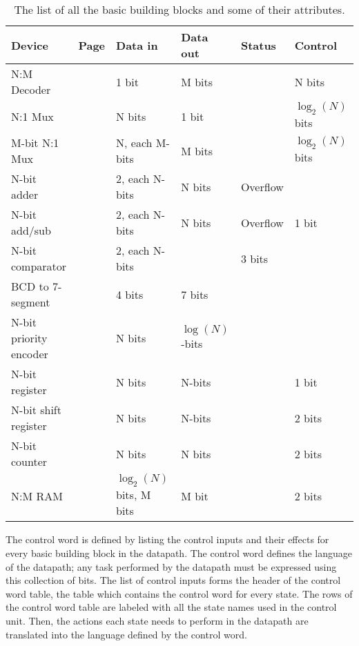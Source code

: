 \begin{table}
{\small
\begin{tabular}{|l|l|l|l|l|l|} \hline
Device      & Page & Data in     & Data out & Status   & Control \\ \hline
N:M Decoder & \pageref{page:dec}          & 1 bit       & M bits  & 	& N bits  \\ \hline
N:1 Mux     & \pageref{page:mux}          & N bits  & 1 bit    & 	&  $\log_2(N)$ bits  \\ \hline
M-bit N:1 Mux   & \pageref{page:wmu}          & N, each M-bits  & M bits & 	&  $\log_2(N)$ bits  \\ \hline
N-bit adder & \pageref{page:add}          & 2, each N-bits & N bits & Overflow &   \\ \hline
N-bit add/sub & \pageref{page:as}         & 2, each N-bits & N bits & Overflow & 1 bit  \\ \hline
N-bit comparator & \pageref{page:com}     & 2, each N-bits &  & 3 bits &   \\ \hline
BCD to 7-segment & \pageref{page:7seg}  & 4 bits & 7 bits & &   \\ \hline
N-bit priority encoder & \pageref{page:prior}  & N bits & $\log(N)$-bits & &   \\ \hline
N-bit register & \pageref{page:reg}       & N bits & N-bits &  & 1 bit  \\ \hline
N-bit shift register & \pageref{page:shi} & N bits & N-bits &  & 2 bits  \\ \hline
N-bit counter & \pageref{page:counter}        & N bits & N bits &  & 2 bits  \\ \hline
N:M RAM & \pageref{page:ram}              & $\log_2(N)$ bits, M bits & M bit & & 2 bits  \\ \hline
\end{tabular}
}
\caption{The list of all the basic building blocks and some of their attributes.}
\label{table:bbblist}
\end{table}
\label{page:boxlist}

The control word is defined by listing the control inputs and their effects
for every basic building block in the datapath.  The control word defines 
the language of the datapath; any task performed by the datapath must
be expressed using this collection of bits.  The list of control inputs
forms the header of the control word table, the table which 
contains the control word for every state.  The rows of the control word 
table are labeled with all the state names used in the control unit.  Then,
the actions each state needs to perform in the datapath are translated 
into the language defined by the control word.  


